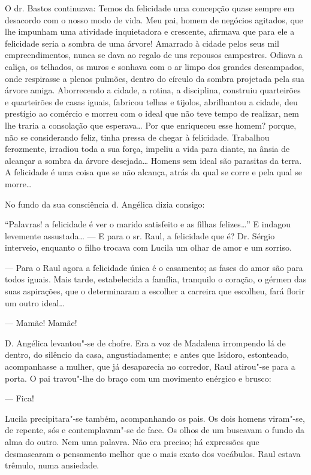 O dr. Bastos continuava: Temos da felicidade uma concepção quase sempre
em desacordo com o nosso modo de vida. Meu pai, homem de negócios
agitados, que lhe impunham uma atividade inquietadora e crescente,
afirmava que para ele a felicidade seria a sombra de uma árvore!
Amarrado à cidade pelos seus mil empreendimentos, nunca se dava ao
regalo de uns repousos campestres. Odiava a caliça, os telhados, os
muros e sonhava com o ar limpo dos grandes descampados, onde respirasse
a plenos pulmões, dentro do círculo da sombra projetada pela sua árvore
amiga. Aborrecendo a cidade, a rotina, a disciplina, construiu
quarteirões e quarteirões de casas iguais, fabricou telhas e tijolos,
abrilhantou a cidade, deu prestígio ao comércio e morreu com o ideal que
não teve tempo de realizar, nem lhe traria a consolação que esperava\ldots{}
Por que enriqueceu esse homem? porque, não se considerando feliz, tinha
pressa de chegar à felicidade. Trabalhou ferozmente, irradiou toda a sua
força, impeliu a vida para diante, na ânsia de alcançar a sombra da
árvore desejada\ldots{} Homens sem ideal são parasitas da terra. A felicidade
é uma coisa que se não alcança, atrás da qual se corre e pela qual se
morre\ldots{}

No fundo da sua consciência d. Angélica dizia consigo:

``Palavras! a felicidade é ver o marido satisfeito e as filhas
felizes\ldots{}'' E indagou levemente assustada\ldots{} --- E para o sr. Raul, a
felicidade que é? Dr. Sérgio interveio, enquanto o filho trocava com
Lucila um olhar de amor e um sorriso.

--- Para o Raul agora a felicidade única é o casamento; as fases do amor
são para todos iguais. Mais tarde, estabelecida a família, tranquilo o
coração, o gérmen das suas aspirações, que o determinaram a escolher a
carreira que escolheu, fará florir um outro ideal\ldots{}

--- Mamãe! Mamãe!

D. Angélica levantou"-se de chofre. Era a voz de Madalena irrompendo lá
de dentro, do silêncio da casa, angustiadamente; e antes que Isidoro,
estonteado, acompanhasse a mulher, que já desaparecia no corredor, Raul
atirou"-se para a porta. O pai travou"-lhe do braço com um movimento
enérgico e brusco:

--- Fica!

Lucila precipitara"-se também, acompanhando os pais. Os dois homens
viram"-se, de repente, sós e contemplavam"-se de face. Os olhos de um
buscavam o fundo da alma do outro. Nem uma palavra. Não era preciso; há
expressões que desmascaram o pensamento melhor que o mais exato dos
vocábulos. Raul estava trêmulo, numa ansiedade.

